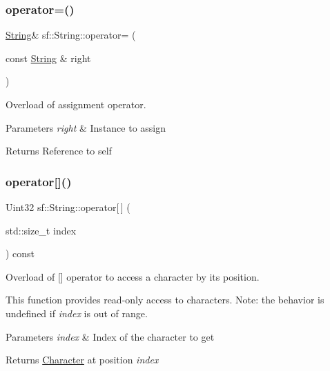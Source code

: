 \subsubsection{\texorpdfstring{operator=()}{operator=()}}
{\footnotesize\ttfamily \mbox{\hyperlink{classsf_1_1_string}{String}}\& sf\+::\+String\+::operator= (\begin{DoxyParamCaption}\item[{const \mbox{\hyperlink{classsf_1_1_string}{String}} \&}]{right }\end{DoxyParamCaption})}



Overload of assignment operator. 


\begin{DoxyParams}{Parameters}
{\em right} & Instance to assign\\
\hline
\end{DoxyParams}
\begin{DoxyReturn}{Returns}
Reference to self \begin{DoxyVerb}\end{DoxyVerb}
 
\end{DoxyReturn}
\mbox{\label{classsf_1_1_string_a035c1b585a0ebed81e773ecafed57926}} 
\subsubsection{\texorpdfstring{operator[]()}{operator[]()}\hspace{0.1cm}{\footnotesize\ttfamily [1/2]}}
{\footnotesize\ttfamily Uint32 sf\+::\+String\+::operator\mbox{[}$\,$\mbox{]} (\begin{DoxyParamCaption}\item[{std\+::size\+\_\+t}]{index }\end{DoxyParamCaption}) const}



Overload of \mbox{[}\mbox{]} operator to access a character by its position. 

This function provides read-\/only access to characters. Note\+: the behavior is undefined if {\itshape index} is out of range.


\begin{DoxyParams}{Parameters}
{\em index} & Index of the character to get\\
\hline
\end{DoxyParams}
\begin{DoxyReturn}{Returns}
\mbox{\hyperlink{class_character}{Character}} at position {\itshape index} \begin{DoxyVerb}\end{DoxyVerb}
 
\end{DoxyReturn}
\mbox{\label{classsf_1_1_string_abc989da7f4fb873ab29188d40772ab24}} 
